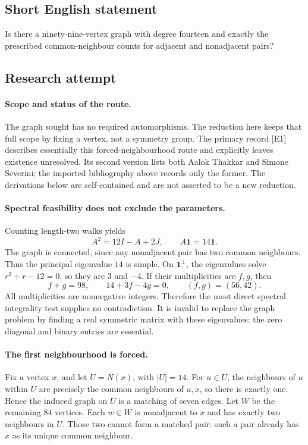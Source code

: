 \documentclass[11pt,a4paper]{article}
\begin{document}
\subsection{Short English statement}

Is there a ninety-nine-vertex graph with degree fourteen and exactly the prescribed common-neighbour counts for adjacent and nonadjacent pairs?

\subsection{Research attempt}

\paragraph{Scope and status of the route.}
The graph sought has no required automorphisms. The reduction here keeps
that full scope by fixing a vertex, not a symmetry group. The primary
record [E1] describes essentially this forced-neighbourhood route and
explicitly leaves existence unresolved. Its second version lists both
Aalok Thakkar and Simone Severini; the imported bibliography above
records only the former. The derivations below are self-contained and
are not asserted to be a new reduction.

\paragraph{Spectral feasibility does not exclude the parameters.}
Counting length-two walks yields
\[
                 A^2=12I-A+2J,\qquad A\mathbf1=14\mathbf1.
\]
The graph is connected, since any nonadjacent pair has two common
neighbours. Thus the principal eigenvalue $14$ is simple. On
$\mathbf1^\perp$, the eigenvalues solve $r^2+r-12=0$, so they are
$3$ and $-4$. If their multiplicities are $f,g$, then
\[
             f+g=98,\qquad 14+3f-4g=0,
             \qquad (f,g)=(56,42).
\]
All multiplicities are nonnegative integers. Therefore the most direct
spectral integrality test supplies no contradiction. It is invalid to
replace the graph problem by finding a real symmetric matrix with
these eigenvalues: the zero diagonal and binary entries are essential.

\paragraph{The first neighbourhood is forced.}
Fix a vertex $x$, and let $U=N(x)$, with $|U|=14$. For $u\in U$,
the neighbours of $u$ within $U$ are precisely the common neighbours
of $u,x$, so there is exactly one. Hence the induced graph on $U$ is
a matching of seven edges. Let $W$ be the remaining $84$ vertices.
Each $w\in W$ is nonadjacent to $x$ and has exactly two neighbours
in $U$. Those two cannot form a matched pair: such a pair already has
$x$ as its unique common neighbour.
\end{document}
